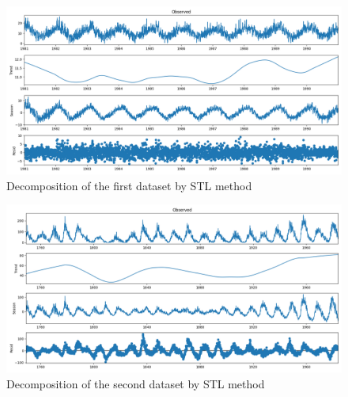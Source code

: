 \documentclass[12pt]{article}
\begin{document}
\begin{enumerate}
\begin{figure}[H]
    \centering
    \begin{minipage}[b]{1\textwidth}
        \includegraphics[width=\textwidth]{figures/Ass1/Ass1_D1_STL.png}
    \end{minipage}
    \caption{Decomposition of the first dataset by STL method}
    \label{fig:Ass1_D1_STL}
\end{figure}

\begin{figure}[H]
    \centering
    \begin{minipage}[b]{1\textwidth}
        \includegraphics[width=\textwidth]{figures/Ass1/Ass1_D2_STL.png}
    \end{minipage}
    \caption{Decomposition of the second dataset by STL method}
    \label{fig:Ass1_D2_STL}
\end{figure}


\end{enumerate}
\end{document}
